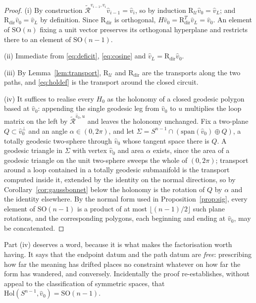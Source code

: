 \documentclass{article}
\theoremstyle{plain}
\theoremstyle{definition}
\numberwithin{equation}{section}
\newcommand{\SO}{\mathrm{SO}}
\newcommand{\Hol}{\mathrm{Hol}}
\newcommand{\Rmin}{\widetilde{\mathcal{R}}}
\newcommand{\Uc}{\mathcal{U}}
\begin{document}
\begin{proof}
(i) By construction $\Rmin^{v_{i-1},v_i}\hat{v}_{i-1} = \hat{v}_i$, so
by induction $\mathrm{R}_\Uc \hat{v}_0 = \hat{v}_L$; and
$\mathrm{R}_{\mathrm{dir}}\hat{v}_0 = \hat{v}_L$ by definition. Since
$\mathrm{R}_{\mathrm{dir}}$ is orthogonal,
$H\hat{v}_0 = \mathrm{R}_{\mathrm{dir}}^{T}\hat{v}_L = \hat{v}_0$. An
element of $\SO(n)$ fixing a unit vector preserves its orthogonal
hyperplane and restricts there to an element of $\SO(n-1)$.

(ii) Immediate from \eqref{eq:deficit}, \eqref{eq:cosine} and
$\hat{v}_L = \mathrm{R}_{\mathrm{dir}}\hat{v}_0$.

(iii) By Lemma~\ref{lem:transport}, $\mathrm{R}_\Uc$ and
$\mathrm{R}_{\mathrm{dir}}$ are the transports along the two paths, and
\eqref{eq:holdef} is the transport around the closed circuit.

(iv) It suffices to realise every $H_0$ as the holonomy of a closed
geodesic polygon based at $\hat{v}_0$: appending the single geodesic leg
from $\hat{v}_0$ to $u$ multiplies the loop matrix on the left by
$\Rmin^{\hat{v}_0,u}$ and leaves the holonomy unchanged. Fix a two-plane
$Q \subset \hat{v}_0^{\perp}$ and an angle $\alpha \in (0,2\pi)$, and let
$\Sigma = S^{n-1}\cap(\mathrm{span}(\hat{v}_0)\oplus Q)$, a totally
geodesic two-sphere through $\hat{v}_0$ whose tangent space there is
$Q$. A geodesic triangle in $\Sigma$ with vertex $\hat{v}_0$ and area
$\alpha$ exists, since the area of a geodesic triangle on the unit
two-sphere sweeps the whole of $(0,2\pi)$; transport around a loop
contained in a totally geodesic submanifold is the transport computed
inside it, extended by the identity on the normal directions, so by
Corollary~\ref{cor:gaussbonnet} below the holonomy is the rotation of
$Q$ by $\alpha$ and the identity elsewhere. By the normal form used in
Proposition~\ref{prop:sig}, every element of $\SO(n-1)$ is a product of
at most $\lfloor (n-1)/2 \rfloor$ such plane rotations, and the
corresponding polygons, each beginning and ending at $\hat{v}_0$, may be
concatenated.
\end{proof}

Part (iv) deserves a word, because it is what makes the factorisation
worth having. It says that the endpoint datum and the path datum are
\emph{free}: prescribing how far the meaning has drifted places no
constraint whatever on how far the form has wandered, and conversely.
Incidentally the proof re-establishes, without appeal to the
classification of symmetric spaces, that
$\Hol(S^{n-1},\hat{v}_0) = \SO(n-1)$.
\end{document}

